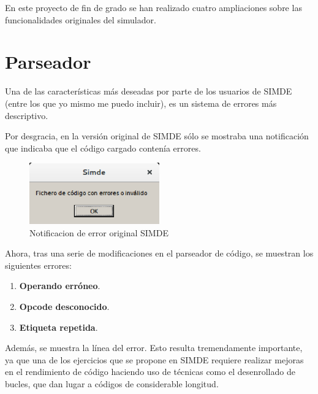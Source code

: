 

En este proyecto de fin de grado se han realizado cuatro ampliaciones sobre las funcionalidades originales 
del simulador. 


\section{Parseador}
\label{6:sec1}

Una de las características más deseadas por parte de los usuarios de SIMDE 
(entre los que yo mismo me puedo incluir), es un sistema de errores más descriptivo. 

Por desgracia, en la versión original de SIMDE sólo se mostraba una notificación que indicaba
que el código cargado contenía errores.

\begin{figure}[!th]
\begin{center}
\includegraphics[width=0.5\textwidth]{images/cap6/errorsimde.eps}
\caption{Notificacion de error original SIMDE}
\end{center}
\end{figure}

Ahora, tras una serie de modificaciones en el parseador de código, se muestran los siguientes errores:

\begin{enumerate}
\item \textbf{Operando erróneo}.
\item \textbf{Opcode desconocido}.
\item \textbf{Etiqueta repetida}.
\end{enumerate}

Además, se muestra la línea del error. Esto resulta tremendamente importante, 
ya que una de los ejercicios que se propone en SIMDE requiere realizar mejoras en el rendimiento
de código haciendo uso de técnicas como el desenrollado de bucles, que dan lugar a códigos de considerable
longitud.

